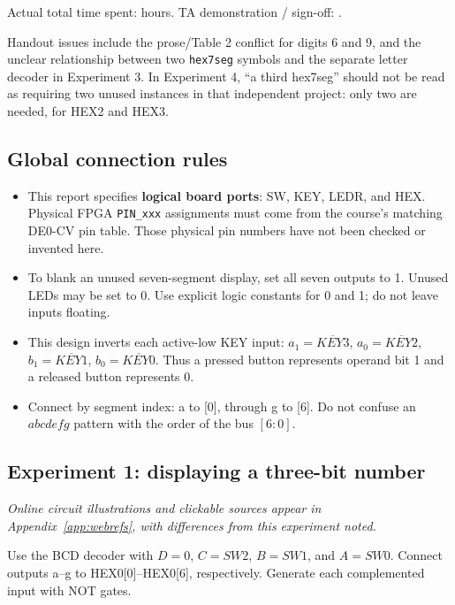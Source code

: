 \documentclass[a4paper,11pt]{article}
\begin{document}
Actual total time spent: \underline{\hspace{2cm}} hours.\quad
TA demonstration / sign-off: \underline{\hspace{3cm}}.

Handout issues include the prose/Table 2 conflict for digits 6 and 9, and the unclear
relationship between two \texttt{hex7seg} symbols and the separate letter decoder in
Experiment 3. In Experiment 4, ``a third hex7seg'' should not be read as requiring two
unused instances in that independent project: only two are needed, for HEX2 and HEX3.
\subsection{Global connection rules}
\begin{itemize}
\item This report specifies \textbf{logical board ports}: SW, KEY, LEDR, and HEX.
Physical FPGA \texttt{PIN\_xxx} assignments must come from the course's matching DE0-CV
pin table. Those physical pin numbers have not been checked or invented here.
\item To blank an unused seven-segment display, set all seven outputs to 1. Unused
LEDs may be set to 0. Use explicit logic constants for 0 and 1; do not leave inputs floating.
\item This design inverts each active-low KEY input:
$a_1=\overline{KEY3}$, $a_0=\overline{KEY2}$,
$b_1=\overline{KEY1}$, $b_0=\overline{KEY0}$.
Thus a pressed button represents operand bit 1 and a released button represents 0.
\item Connect by segment index: a to [0], through g to [6]. Do not confuse an
$abcdefg$ pattern with the order of the bus $[6:0]$.
\end{itemize}
\subsection{Experiment 1: displaying a three-bit number}
\noindent\textit{Online circuit illustrations and clickable sources appear in Appendix~\ref{app:webrefs}, with differences from this experiment noted.}

Use the BCD decoder with $D=0$, $C=SW2$, $B=SW1$, and $A=SW0$. Connect outputs a--g
to HEX0[0]--HEX0[6], respectively. Generate each complemented input with NOT gates.


\begin{center}\end{center}
\end{document}
